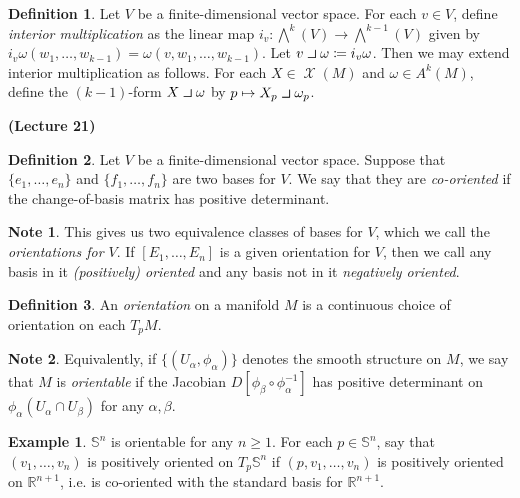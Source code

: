 \documentclass[10pt,letterpaper,cm]{nupset}
\theoremstyle{definition}
\newtheorem*{definition}{Definition}
\newtheorem{exmp}{Example}
\newtheorem*{note}{Note}
\newcommand{\R}{\mathbb R}
\renewcommand{\S}{\mathbb S}
\newcommand{\1}{\mathbf{1}}
\newcommand{\0}{\vec 0}
\newcommand{\intprodl}{%
    \mathbin{\scalebox{1.5}{$\lrcorner$}}%
}
\DeclareMathOperator{\vf}{\mathscr{X}}
\begin{document}
\begin{definition}
Let $V$ be a finite-dimensional vector space. For each $v\in V$, define \textit{interior multiplication} as the linear map $i_v: \bigwedge^k(V) \to \bigwedge^{k-1}(V)$ given by $i_v \omega(w_1, \ldots, w_{k-1})= \omega(v, w_1, \ldots, w_{k-1}).$ Let $v \intprodl \omega \coloneqq  i_v \omega$. Then we may extend interior multiplication as follows. For each $X \in \vf(M)$ and $\omega \in A^k(M)$, define the $(k-1)$-form $X \intprodl \omega$ by $p\mapsto  X_p \intprodl \omega_p$.
\end{definition}

\begin{center}
{\textbf{(Lecture 21)}} 
\end{center}

\begin{definition}
Let $V$ be a finite-dimensional vector space. Suppose that $\{e_1, \ldots, e_n\}$ and $\{f_1, \ldots, f_n\}$ are two bases for $V$. We say that they are \textit{co-oriented} if the change-of-basis matrix  has positive determinant.
\begin{note}
This gives us two equivalence classes of bases for $V$, which we call the \textit{orientations for $V$}. If $[E_1, \ldots, E_n]$ is a given orientation for $V$, then we call any basis in it \textit{(positively) oriented} and any basis not in it \textit{negatively oriented}.
\end{note}
\end{definition}

\begin{definition}
An \textit{orientation} on a manifold $M$ is a continuous choice of orientation on each $T_pM$. 
\end{definition}
\begin{note}
Equivalently, if $\{(U_{\alpha}, \phi_{\alpha})\}$ denotes the smooth structure on $M$, we say that $M$ is \textit{orientable} if the Jacobian $D[\phi_{\beta} \circ \phi_{\alpha}^{-1}]$ has positive determinant on $\phi_{\alpha}(U_{\alpha}\cap U_{\beta})$ for any $\alpha, \beta$.
\end{note}

\begin{exmp}
$\S^n$ is orientable for any $n\geq 1$. For each $p \in \S^n$, say that $(v_1, \ldots, v_n)$ is positively oriented on $T_p\S^n$ if $(p, v_1, \ldots, v_n)$ is positively oriented on $\R^{n+1}$, i.e. is co-oriented with the standard basis for $\R^{n+1}$.
\end{exmp}
\end{document}
